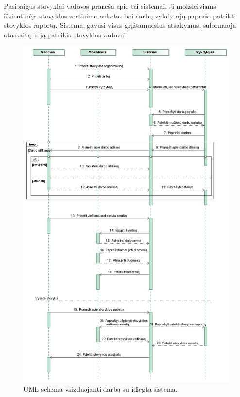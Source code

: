Pasibaigus stovyklai vadovas praneša apie tai sistemai. Ji moksleiviams
išsiuntinėja stovyklos vertinimo anketas bei darbų vykdytojų paprašo 
pateikti stovyklos raportą. Sistema, gavusi visus grįžtamuosius atsakymus,
suformuoja ataskaitą ir ją pateikia stovyklos vadovui.

\begin{figure}[htb]
  \begin{center}
    \includegraphics[scale=0.7]{images/Seka.png}
    \caption{UML schema vaizduojanti darbą su įdiegta sistema.}
  \end{center}
  \label{fig:uml_usecase}
\end{figure}


